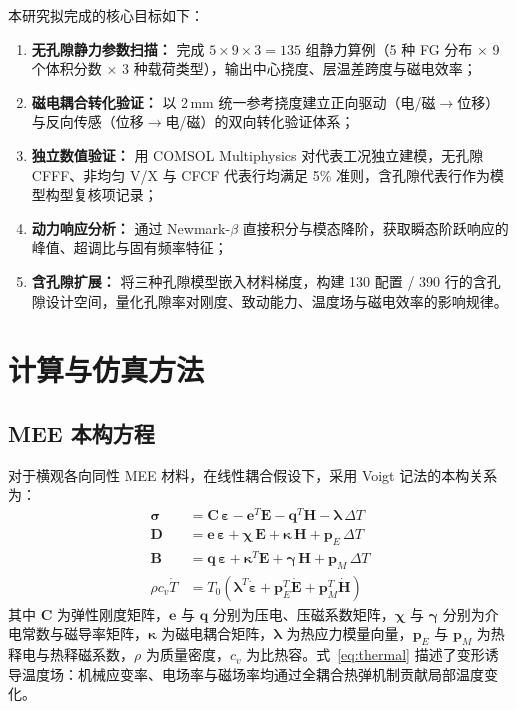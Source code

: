 \documentclass[11pt,a4paper]{ctexart}
\newcommand{\bsig}{\bm{\sigma}}
\newcommand{\beps}{\bm{\varepsilon}}
\newcommand{\bD}{\bm{D}}
\newcommand{\bB}{\bm{B}}
\newcommand{\bE}{\bm{E}}
\newcommand{\bH}{\bm{H}}
\begin{document}
本研究拟完成的核心目标如下：
\begin{enumerate}[leftmargin=2em]
\item \textbf{无孔隙静力参数扫描：} 完成 $5\times9\times3=135$ 组静力算例（5 种 FG 分布 $\times$ 9 个体积分数 $\times$ 3 种载荷类型），输出中心挠度、层温差跨度与磁电效率；
\item \textbf{磁电耦合转化验证：} 以 2\,mm 统一参考挠度建立正向驱动（电/磁$\to$位移）与反向传感（位移$\to$电/磁）的双向转化验证体系；
\item \textbf{独立数值验证：} 用 COMSOL Multiphysics 对代表工况独立建模，无孔隙 CFFF、非均匀 V/X 与 CFCF 代表行均满足 5\% 准则，含孔隙代表行作为模型构型复核项记录；
\item \textbf{动力响应分析：} 通过 Newmark-$\beta$ 直接积分与模态降阶，获取瞬态阶跃响应的峰值、超调比与固有频率特征；
\item \textbf{含孔隙扩展：} 将三种孔隙模型嵌入材料梯度，构建 130 配置 / 390 行的含孔隙设计空间，量化孔隙率对刚度、致动能力、温度场与磁电效率的影响规律。
\end{enumerate}

\section{计算与仿真方法}

\subsection{MEE 本构方程}

对于横观各向同性 MEE 材料，在线性耦合假设下，采用 Voigt 记法的本构关系为：
\begin{align}
\bsig &= \bm{C}\,\beps - \bm{e}^T\bE - \bm{q}^T\bH - \bm{\lambda}\,\Delta T \label{eq:stress}\\
\bD &= \bm{e}\,\beps + \bm{\chi}\,\bE + \bm{\kappa}\,\bH + \bm{p}_E\,\Delta T \label{eq:D}\\
\bB &= \bm{q}\,\beps + \bm{\kappa}^T\bE + \bm{\gamma}\,\bH + \bm{p}_M\,\Delta T \label{eq:B}\\
\rho c_v \dot{T} &= T_0\left(\bm{\lambda}^T\dot{\beps} + \bm{p}_E^T\dot{\bE} + \bm{p}_M^T\dot{\bH}\right) \label{eq:thermal}
\end{align}
其中 $\bm{C}$ 为弹性刚度矩阵，$\bm{e}$ 与 $\bm{q}$ 分别为压电、压磁系数矩阵，$\bm{\chi}$ 与 $\bm{\gamma}$ 分别为介电常数与磁导率矩阵，$\bm{\kappa}$ 为磁电耦合矩阵，$\bm{\lambda}$ 为热应力模量向量，$\bm{p}_E$ 与 $\bm{p}_M$ 为热释电与热释磁系数，$\rho$ 为质量密度，$c_v$ 为比热容。式~\eqref{eq:thermal} 描述了变形诱导温度场：机械应变率、电场率与磁场率均通过全耦合热弹机制贡献局部温度变化。
\end{document}
